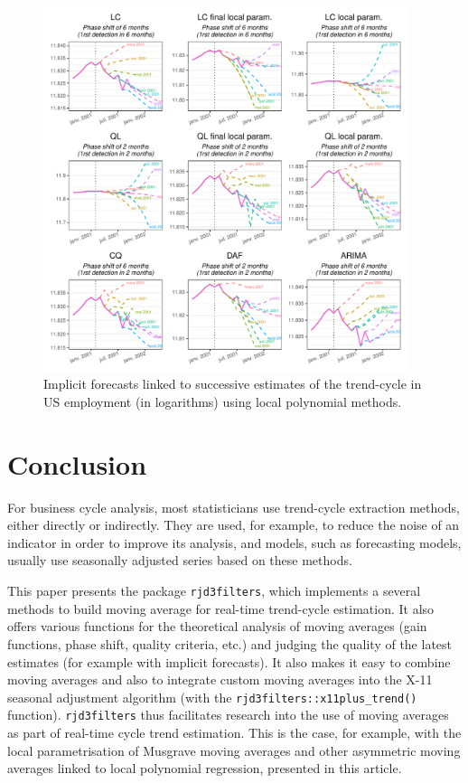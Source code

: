 \documentclass[
]{article}
\newcommand\1{\mathds{1}}
\begin{document}
\begin{figure}[H]

\caption{\label{fig-ce16ov-previmp-lp}Implicit forecasts linked to
successive estimates of the trend-cycle in US employment (in logarithms)
using local polynomial methods.}

{\centering \includegraphics[width=0.95\textwidth,height=\textheight]{img/nber/ce16ov_fev2001_prev_imp_lp.pdf}

}

\end{figure}

\hypertarget{conclusion}{%
\section*{Conclusion}\label{conclusion}}

For business cycle analysis, most statisticians use trend-cycle
extraction methods, either directly or indirectly. They are used, for
example, to reduce the noise of an indicator in order to improve its
analysis, and models, such as forecasting models, usually use seasonally
adjusted series based on these methods.

This paper presents the  package \texttt{rjd3filters},
which implements a several methods to build moving average for real-time
trend-cycle estimation. It also offers various functions for the
theoretical analysis of moving averages (gain functions, phase shift,
quality criteria, etc.) and judging the quality of the latest estimates
(for example with implicit forecasts). It also makes it easy to combine
moving averages and also to integrate custom moving averages into the
X-11 seasonal adjustment algorithm (with the
\texttt{rjd3filters::x11plus\_trend()} function). \texttt{rjd3filters}
thus facilitates research into the use of moving averages as part of
real-time cycle trend estimation. This is the case, for example, with
the local parametrisation of Musgrave moving averages and other
asymmetric moving averages linked to local polynomial regression,
presented in this article.
\end{document}
